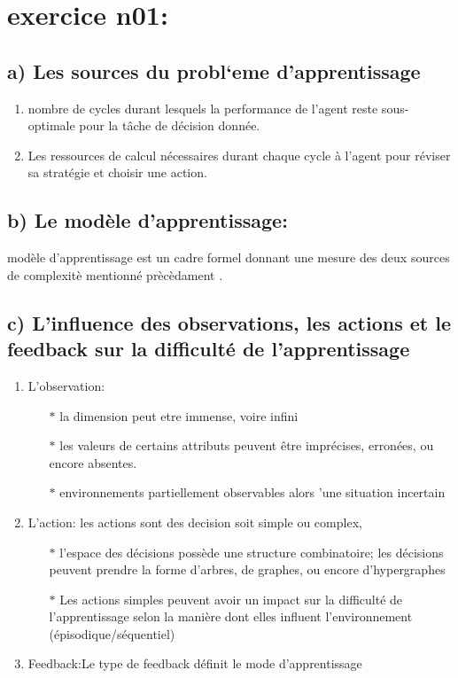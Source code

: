 \documentclass{article}
\begin{document}
\section*{exercice n01:}
    \subsection*{a) Les sources du probl`eme d’apprentissage}
    \begin{enumerate}
        \item nombre de cycles durant lesquels la performance 
        de l’agent reste sous-optimale pour la tâche de décision donnée.
        \item Les ressources de calcul nécessaires durant chaque 
        cycle à l’agent pour réviser sa stratégie et choisir une action.



    \end{enumerate}
    \subsection*{b)   Le modèle d’apprentissage:}
    modèle d’apprentissage est un cadre formel donnant une mesure des deux
    sources de complexitè mentionné prècèdament .
    \subsection*{c) L'influence des observations, les actions et le feedback sur la difficulté de l’apprentissage}
    \begin{enumerate}
    \item  L'observation:
          \begin{itemize}
    
              \item[$\ast$] la dimension peut etre immense, voire infini
              \item[$\ast$]  les valeurs de certains attributs peuvent être imprécises, erronées, ou encore absentes.
              \item[$\ast$]  environnements partiellement observables alors ’une situation incertain
            \end{itemize}
     \item  L'action: les actions sont des decision soit simple ou complex, 
    \begin{itemize}
    
        \item[$\ast$] l’espace des décisions possède une structure combinatoire; les décisions peuvent prendre la forme d’arbres, 
        de graphes, ou encore d’hypergraphes
         \item[$\ast$] Les actions simples peuvent avoir un impact sur la difficulté de 
         l’apprentissage selon la manière dont elles influent l’environnement  (épisodique/séquentiel)
      \end{itemize}
      \item  Feedback:Le type de feedback définit le mode d’apprentissage

     \end{enumerate}
     
\end{document}
